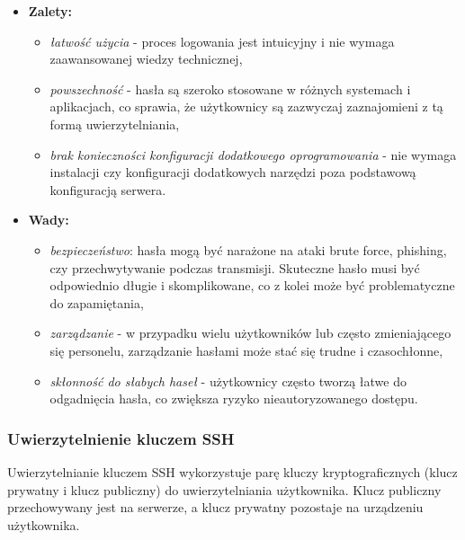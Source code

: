 \documentclass{article}
\begin{document}
\begin{itemize}
    \item \textbf{Zalety:}
    \begin{itemize}
        \item \textit{łatwość użycia} - proces logowania jest intuicyjny i nie wymaga zaawansowanej wiedzy technicznej,
        \item \textit{powszechność} - hasła są szeroko stosowane w różnych systemach i aplikacjach, co sprawia, że użytkownicy są zazwyczaj zaznajomieni z tą formą uwierzytelniania,
        \item \textit{brak konieczności konfiguracji dodatkowego oprogramowania} - nie wymaga instalacji czy konfiguracji dodatkowych narzędzi poza podstawową konfiguracją serwera.
    \end{itemize}
    \item \textbf{Wady:}
    \begin{itemize}
        \item \textit{bezpieczeństwo}: hasła mogą być narażone na ataki brute force, phishing, czy przechwytywanie podczas transmisji. Skuteczne hasło musi być odpowiednio długie i skomplikowane, co z kolei może być problematyczne do zapamiętania,
        \item \textit{zarządzanie} - w przypadku wielu użytkowników lub często zmieniającego się personelu, zarządzanie hasłami może stać się trudne i czasochłonne,
        \item \textit{skłonność do słabych haseł} - użytkownicy często tworzą łatwe do odgadnięcia hasła, co zwiększa ryzyko nieautoryzowanego dostępu.
    \end{itemize}
\end{itemize}

\subsubsection{Uwierzytelnienie kluczem SSH}

Uwierzytelnianie kluczem SSH wykorzystuje parę kluczy kryptograficznych (klucz prywatny i klucz publiczny) do uwierzytelniania użytkownika. Klucz publiczny przechowywany jest na serwerze, a klucz prywatny pozostaje na urządzeniu użytkownika.
\end{document}
